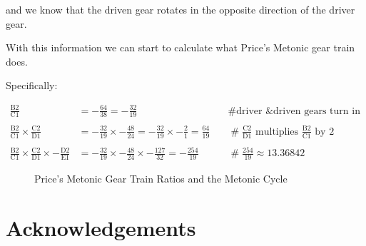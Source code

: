 \documentclass[11pt, oneside]{article}   	%
\theoremstyle{definition}
\begin{document}
\bigskip
\noindent
and we know that the driven gear rotates in the opposite direction of the driver gear. 


\bigskip
\noindent
With this information we can start to calculate what Price's Metonic gear train does. 

\bigskip
\noindent
Specifically:

\begin{equation*}
\begin{array}{lllll}
\frac{\text{B2}}{\text{C1}} &= - \frac{64}{38} = - \frac{32}{19} & \quad \mathrel{\#} \text{driver \& driven gears turn in opposite directions} \\ \\
\frac{\text{B2}}{\text{C1}} \times \frac{\text{C2}}{\text{D1}} &= - \frac{32}{19} \times - \frac{48}{24} = - \frac{32}{19} \times - \frac{2}{1} = \frac{64}{19} 
& \quad \mathrel{\#} \frac{\text{C2}}{\text{D1}} \text{ multiplies $\frac{\text{B2}}{\text{C1}}$ by $2$}                       \\ \\
\frac{\text{B2}}{\text{C1}} \times \frac{\text{C2}}{\text{D1}} \times - \frac{\text{D2}}{\text{E1}} &= - \frac{32}{19} \times - \frac{48}{24} \times - \frac{127}{32} 
=  -\frac{254}{19} & \quad \mathrel{\#} \frac{254}{19} \approx 13.36842
\end{array}
\end{equation*}


\bigskip
\begin{figure}[H]
\caption{Price's Metonic Gear Train Ratios and the Metonic Cycle}
\label{fig:metonic_gear_ratios}
\end{figure}

\bigskip
\section{Acknowledgements}

\newpage


\end{document}

